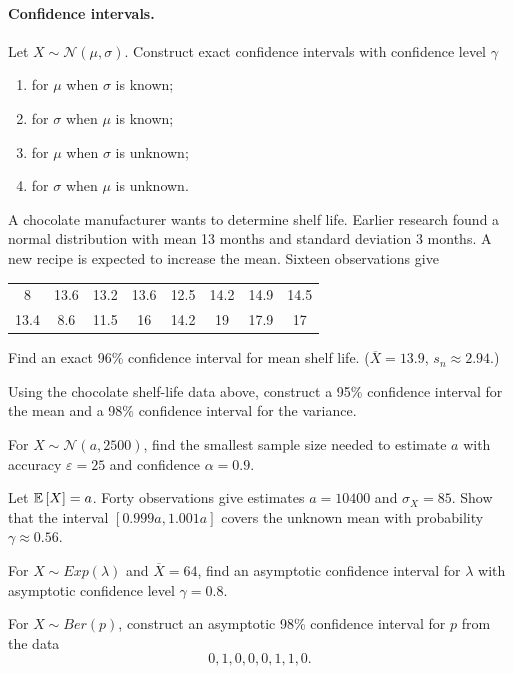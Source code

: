 \documentclass[a4paper]{report}
\begin{document}
\paragraph{Confidence intervals.}
\begin{problem}
Let $X\sim\mathcal N(\mu,\sigma)$. Construct exact confidence intervals with confidence level $\gamma$
\begin{enumerate}\item for $\mu$ when $\sigma$ is known;\item for $\sigma$ when $\mu$ is known;\item for $\mu$ when $\sigma$ is unknown;\item for $\sigma$ when $\mu$ is unknown.\end{enumerate}
\end{problem}
\begin{problem}
A chocolate manufacturer wants to determine shelf life. Earlier research found a normal distribution with mean 13 months and standard deviation 3 months. A new recipe is expected to increase the mean. Sixteen observations give
\begin{center}\begin{tabular}{cccccccc}
8&13.6&13.2&13.6&12.5&14.2&14.9&14.5\\
13.4&8.6&11.5&16&14.2&19&17.9&17
\end{tabular}\end{center}
Find an exact 96\% confidence interval for mean shelf life. ($\overline X=13.9$, $s_n\approx2.94$.)
\end{problem}
\begin{problem}
Using the chocolate shelf-life data above, construct a 95\% confidence interval for the mean and a 98\% confidence interval for the variance.
\end{problem}
\begin{problem}
For $X\sim\mathcal N(a,2500)$, find the smallest sample size needed to estimate $a$ with accuracy $\varepsilon=25$ and confidence $\alpha=0.9$.
\end{problem}
\begin{problem}
Let $\mathbb {E}\left[ X\right]=a$. Forty observations give estimates $a=10400$ and $\sigma_X=85$. Show that the interval $[0.999a,1.001a]$ covers the unknown mean with probability $\gamma\approx0.56$.
\end{problem}
\begin{problem}
For $X\sim Exp(\lambda)$ and $\overline X=64$, find an asymptotic confidence interval for $\lambda$ with asymptotic confidence level $\gamma=0.8$.
\end{problem}
\begin{problem}
For $X\sim Ber(p)$, construct an asymptotic 98\% confidence interval for $p$ from the data
\[0,1,0,0,0,1,1,0.\]
\end{problem}
\end{document}
